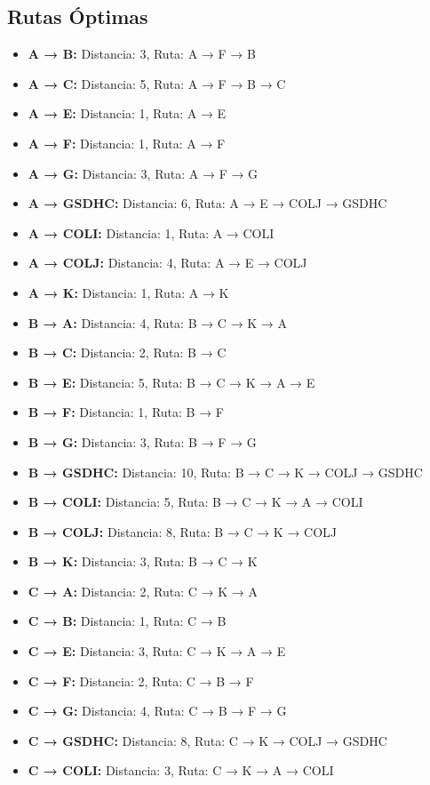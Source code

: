 \documentclass[12pt]{article}
\begin{document}
\subsection{Rutas Óptimas}
\begin{itemize}
\item \textbf{A → B:} Distancia: 3, Ruta: A → F → B
\item \textbf{A → C:} Distancia: 5, Ruta: A → F → B → C
\item \textbf{A → E:} Distancia: 1, Ruta: A → E
\item \textbf{A → F:} Distancia: 1, Ruta: A → F
\item \textbf{A → G:} Distancia: 3, Ruta: A → F → G
\item \textbf{A → GSDHC:} Distancia: 6, Ruta: A → E → COLJ → GSDHC
\item \textbf{A → COLI:} Distancia: 1, Ruta: A → COLI
\item \textbf{A → COLJ:} Distancia: 4, Ruta: A → E → COLJ
\item \textbf{A → K:} Distancia: 1, Ruta: A → K
\item \textbf{B → A:} Distancia: 4, Ruta: B → C → K → A
\item \textbf{B → C:} Distancia: 2, Ruta: B → C
\item \textbf{B → E:} Distancia: 5, Ruta: B → C → K → A → E
\item \textbf{B → F:} Distancia: 1, Ruta: B → F
\item \textbf{B → G:} Distancia: 3, Ruta: B → F → G
\item \textbf{B → GSDHC:} Distancia: 10, Ruta: B → C → K → COLJ → GSDHC
\item \textbf{B → COLI:} Distancia: 5, Ruta: B → C → K → A → COLI
\item \textbf{B → COLJ:} Distancia: 8, Ruta: B → C → K → COLJ
\item \textbf{B → K:} Distancia: 3, Ruta: B → C → K
\item \textbf{C → A:} Distancia: 2, Ruta: C → K → A
\item \textbf{C → B:} Distancia: 1, Ruta: C → B
\item \textbf{C → E:} Distancia: 3, Ruta: C → K → A → E
\item \textbf{C → F:} Distancia: 2, Ruta: C → B → F
\item \textbf{C → G:} Distancia: 4, Ruta: C → B → F → G
\item \textbf{C → GSDHC:} Distancia: 8, Ruta: C → K → COLJ → GSDHC
\item \textbf{C → COLI:} Distancia: 3, Ruta: C → K → A → COLI

\end{itemize}
\end{document}
